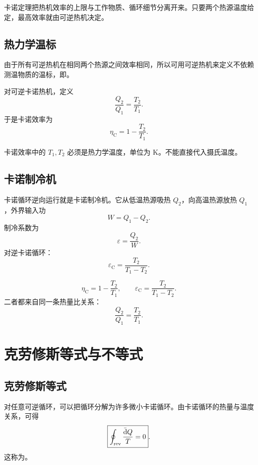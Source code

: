 \begin{KeyBox}[卡诺定理的物理意义]
卡诺定理把热机效率的上限与工作物质、循环细节分离开来。只要两个热源温度给定，最高效率就由可逆热机决定。
\end{KeyBox}

\subsection{热力学温标}

由于所有可逆热机在相同两个热源之间效率相同，所以可用可逆热机来定义不依赖测温物质的温标，即。

对可逆卡诺热机，定义
\[
  \frac{Q_2}{Q_1}=\frac{T_2}{T_1}.
\]
于是卡诺效率为
\[
  \boxed{
  \eta_{\mathrm C}=1-\frac{T_2}{T_1}
  }.
\]

\begin{WarnBox}[温度必须用开尔文]
卡诺效率中的 \(T_1,T_2\) 必须是热力学温度，单位为 \(\mathrm K\)。不能直接代入摄氏温度。
\end{WarnBox}

\subsection{卡诺制冷机}

卡诺循环逆向运行就是卡诺制冷机。它从低温热源吸热 \(Q_2\)，向高温热源放热 \(Q_1\)，外界输入功
\[
  W=Q_1-Q_2.
\]
制冷系数为
\[
  \varepsilon=\frac{Q_2}{W}.
\]
对逆卡诺循环：
\[
  \boxed{
  \varepsilon_{\mathrm C}=\frac{T_2}{T_1-T_2}
  }.
\]

\begin{KeyBox}[卡诺热机与卡诺制冷机]
\[
  \eta_{\mathrm C}=1-\frac{T_2}{T_1},
  \qquad
  \varepsilon_{\mathrm C}=\frac{T_2}{T_1-T_2}.
\]
二者都来自同一条热量比关系：
\[
  \frac{Q_2}{Q_1}=\frac{T_2}{T_1}.
\]
\end{KeyBox}

\section{克劳修斯等式与不等式}

\subsection{克劳修斯等式}

对任意可逆循环，可以把循环分解为许多微小卡诺循环。由卡诺循环的热量与温度关系，可得
\[
  \boxed{
  \oint_{\mathrm{rev}}\frac{\mathop{}\!\bar{\mathrm{d}} Q}{T}=0
  }.
\]
这称为。

